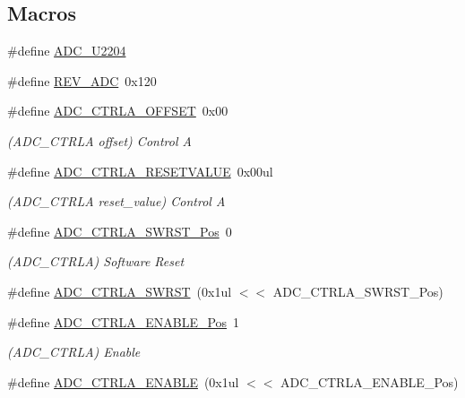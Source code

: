 \subsection*{Macros}
\begin{DoxyCompactItemize}
\item 
\#define \mbox{\hyperlink{group___s_a_m_d21___a_d_c_gab5adf5cbab9a4bc37774777d99780567}{A\+D\+C\+\_\+\+U2204}}
\item 
\#define \mbox{\hyperlink{group___s_a_m_d21___a_d_c_gaa192aaf51cf256cf2d8a5e95601fdb0a}{R\+E\+V\+\_\+\+A\+DC}}~0x120
\item 
\#define \mbox{\hyperlink{group___s_a_m_d21___a_d_c_ga6ecd1e22b3acb8e29dbc4707a32dbbe7}{A\+D\+C\+\_\+\+C\+T\+R\+L\+A\+\_\+\+O\+F\+F\+S\+ET}}~0x00
\begin{DoxyCompactList}\small\item\em (A\+D\+C\+\_\+\+C\+T\+R\+LA offset) Control A \end{DoxyCompactList}\item 
\#define \mbox{\hyperlink{group___s_a_m_d21___a_d_c_ga3d883ad1cad4255a6d5d789742d28e9f}{A\+D\+C\+\_\+\+C\+T\+R\+L\+A\+\_\+\+R\+E\+S\+E\+T\+V\+A\+L\+UE}}~0x00ul
\begin{DoxyCompactList}\small\item\em (A\+D\+C\+\_\+\+C\+T\+R\+LA reset\+\_\+value) Control A \end{DoxyCompactList}\item 
\#define \mbox{\hyperlink{group___s_a_m_d21___a_d_c_gaf8ef9401077365b9f9fe6f89c96efab8}{A\+D\+C\+\_\+\+C\+T\+R\+L\+A\+\_\+\+S\+W\+R\+S\+T\+\_\+\+Pos}}~0
\begin{DoxyCompactList}\small\item\em (A\+D\+C\+\_\+\+C\+T\+R\+LA) Software Reset \end{DoxyCompactList}\item 
\#define \mbox{\hyperlink{group___s_a_m_d21___a_d_c_ga2b9532db668cf76f61d6feb59c9d8ab1}{A\+D\+C\+\_\+\+C\+T\+R\+L\+A\+\_\+\+S\+W\+R\+ST}}~(0x1ul $<$$<$ A\+D\+C\+\_\+\+C\+T\+R\+L\+A\+\_\+\+S\+W\+R\+S\+T\+\_\+\+Pos)
\item 
\#define \mbox{\hyperlink{group___s_a_m_d21___a_d_c_gac82ee67f4cbe73c614e78ac5789daa88}{A\+D\+C\+\_\+\+C\+T\+R\+L\+A\+\_\+\+E\+N\+A\+B\+L\+E\+\_\+\+Pos}}~1
\begin{DoxyCompactList}\small\item\em (A\+D\+C\+\_\+\+C\+T\+R\+LA) Enable \end{DoxyCompactList}\item 
\#define \mbox{\hyperlink{group___s_a_m_d21___a_d_c_gae5d9a0d315c90a29623d8322b9c5ddbd}{A\+D\+C\+\_\+\+C\+T\+R\+L\+A\+\_\+\+E\+N\+A\+B\+LE}}~(0x1ul $<$$<$ A\+D\+C\+\_\+\+C\+T\+R\+L\+A\+\_\+\+E\+N\+A\+B\+L\+E\+\_\+\+Pos)

\end{DoxyCompactItemize}
